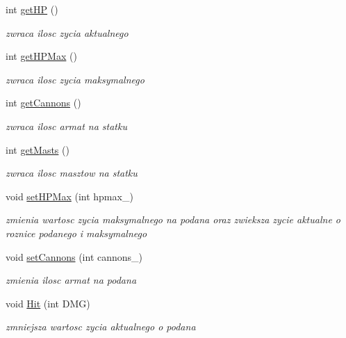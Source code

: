 \begin{DoxyCompactItemize}
\mbox{\label{class_ship_ae99c45d37b4d1bd79a74d4745251b59c}} 
int \hyperlink{class_ship_ae99c45d37b4d1bd79a74d4745251b59c}{get\+HP} ()
\begin{DoxyCompactList}\small\item\em zwraca ilosc zycia aktualnego \end{DoxyCompactList}\item 
\mbox{\label{class_ship_accc55a9b14a92fb41ac2d3ebe80e23e5}} 
int \hyperlink{class_ship_accc55a9b14a92fb41ac2d3ebe80e23e5}{get\+H\+P\+Max} ()
\begin{DoxyCompactList}\small\item\em zwraca ilosc zycia maksymalnego \end{DoxyCompactList}\item 
\mbox{\label{class_ship_a7a9dc5f45fa613557853925235a3a752}} 
int \hyperlink{class_ship_a7a9dc5f45fa613557853925235a3a752}{get\+Cannons} ()
\begin{DoxyCompactList}\small\item\em zwraca ilosc armat na statku \end{DoxyCompactList}\item 
\mbox{\label{class_ship_a937ffa88e426e8b0bb0006314111d1d2}} 
int \hyperlink{class_ship_a937ffa88e426e8b0bb0006314111d1d2}{get\+Masts} ()
\begin{DoxyCompactList}\small\item\em zwraca ilosc masztow na statku \end{DoxyCompactList}\item 
\mbox{\label{class_ship_a90a24cf803f294ab17d0900379268fc2}} 
void \hyperlink{class_ship_a90a24cf803f294ab17d0900379268fc2}{set\+H\+P\+Max} (int hpmax\+\_\+)
\begin{DoxyCompactList}\small\item\em zmienia wartosc zycia maksymalnego na podana oraz zwieksza zycie aktualne o roznice podanego i maksymalnego \end{DoxyCompactList}\item 
\mbox{\label{class_ship_ab3b9f082db652dd440736dc79a4ed507}} 
void \hyperlink{class_ship_ab3b9f082db652dd440736dc79a4ed507}{set\+Cannons} (int cannons\+\_\+)
\begin{DoxyCompactList}\small\item\em zmienia ilosc armat na podana \end{DoxyCompactList}\item 
\mbox{\label{class_ship_a13d7e59a6e96c98b342dd97473f71c38}} 
void \hyperlink{class_ship_a13d7e59a6e96c98b342dd97473f71c38}{Hit} (int D\+MG)
\begin{DoxyCompactList}\small\item\em zmniejsza wartosc zycia aktualnego o podana \end{DoxyCompactList}\end{DoxyCompactItemize}
